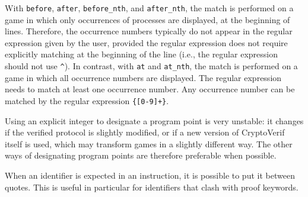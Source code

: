 \documentclass{article}
\begin{document}
With \texttt{before}, \texttt{after}, \texttt{before\_nth}, and \texttt{after\_nth},
the match is performed on a game in which only occurrences of processes are
displayed, at the beginning of lines. Therefore, the occurrence numbers typically
do not appear in the regular expression given by the user, provided the
regular expression does not require explicitly matching at the beginning of the line
(i.e., the regular expression should not use \texttt{\^}).
In contrast, with \texttt{at} and \texttt{at\_nth}, the match is performed
on a game in which all occurrence numbers are displayed. The regular expression needs to match
at least one occurrence number. Any occurrence number can be matched by
the regular expression \texttt{\{[0-9]+\}}.

Using an explicit integer to designate a program point is very unstable:
it changes if the verified protocol is slightly modified, or
if a new version of CryptoVerif itself is used, which may transform
games in a slightly different way.
The other ways of designating program points are therefore preferable
when possible.

When an identifier is expected in an instruction, it is possible
to put it between quotes. This is useful in particular for identifiers
that clash with proof keywords.
\end{document}
